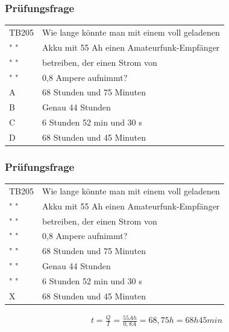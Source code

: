 \begin{frame}
    \frametitle{Prüfungsfrage}
    \begin{center}
    \begin{tabular}{l||l}\hline
        TB205 & Wie lange könnte man mit einem voll geladenen\\
        " " & Akku mit 55 Ah einen Amateurfunk-Empfänger\\ 
        " " & betreiben, der einen Strom von\\ 
        " " & 0,8 Ampere aufnimmt?\\ \hline\hline
         A & 68 Stunden und 75 Minuten \\ \hline
         B & Genau 44 Stunden \\ \hline
         C & 6 Stunden 52 min und 30 s \\\hline
         D & 68 Stunden und 45 Minuten \\\hline
    \end{tabular}
 	\end{center}
\end{frame}

\begin{frame}
    \frametitle{Prüfungsfrage}
    \begin{center}
    \begin{tabular}{l||l}\hline
        TB205 & Wie lange könnte man mit einem voll geladenen\\
        " " & Akku mit 55 Ah einen Amateurfunk-Empfänger\\ 
        " " & betreiben, der einen Strom von\\ 
        " " & 0,8 Ampere aufnimmt?\\ \hline\hline
         " " & 68 Stunden und 75 Minuten \\ \hline
         " " & Genau 44 Stunden \\ \hline
         " " & 6 Stunden 52 min und 30 s \\\hline
         X & 68 Stunden und 45 Minuten \\\hline
    \end{tabular}
      \begin{align} 
	t = \frac{Q}{I} = \frac{55 Ah}{0,8 A} = 68,75 h = 68 h 45 min
      \end{align}
 	\end{center}
 	
\end{frame}

